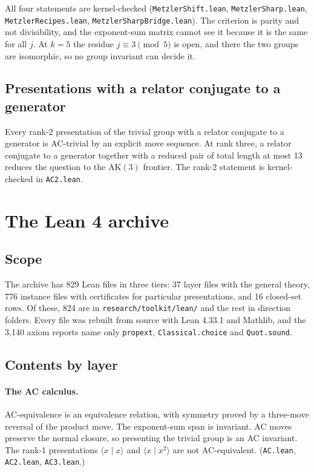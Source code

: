 \documentclass[11pt,a4paper]{article}
\theoremstyle{definition}
\newcommand{\AK}{\mathrm{AK}}
\begin{document}
All four statements are kernel-checked (\texttt{MetzlerShift.lean}, \texttt{MetzlerSharp.lean}, \texttt{MetzlerRecipes.lean}, \texttt{MetzlerSharpBridge.lean}). The criterion is parity and not divisibility, and the exponent-sum matrix cannot see it because it is the same for all $j$. At $k=5$ the residue $j\equiv3 \pmod 5$ is open, and there the two groups are isomorphic, so no group invariant can decide it.

\subsection{Presentations with a relator conjugate to a generator}

Every rank-2 presentation of the trivial group with a relator conjugate to a generator is AC-trivial by an explicit move sequence. At rank three, a relator conjugate to a generator together with a reduced pair of total length at most 13 reduces the question to the $\AK(3)$ frontier. The rank-2 statement is kernel-checked in \texttt{AC2.lean}.

\section{The Lean 4 archive}\label{sec:lean}

\subsection{Scope}

The archive has 829 Lean files in three tiers: 37 layer files with the general theory, 776 instance files with certificates for particular presentations, and 16 closed-set rows. Of these, 824 are in \texttt{research/toolkit/lean/} and the rest in direction folders. Every file was rebuilt from source with Lean 4.33.1 and Mathlib, and the 3,140 axiom reports name only \texttt{propext}, \texttt{Classical.choice} and \texttt{Quot.sound}.

\subsection{Contents by layer}

\paragraph{The AC calculus.} AC-equivalence is an equivalence relation, with symmetry proved by a three-move reversal of the product move. The exponent-sum span is invariant. AC moves preserve the normal closure, so presenting the trivial group is an AC invariant. The rank-1 presentations $\langle x\mid x\rangle$ and $\langle x\mid x^2\rangle$ are not AC-equivalent. (\texttt{AC.lean}, \texttt{AC2.lean}, \texttt{AC3.lean}.)
\end{document}
